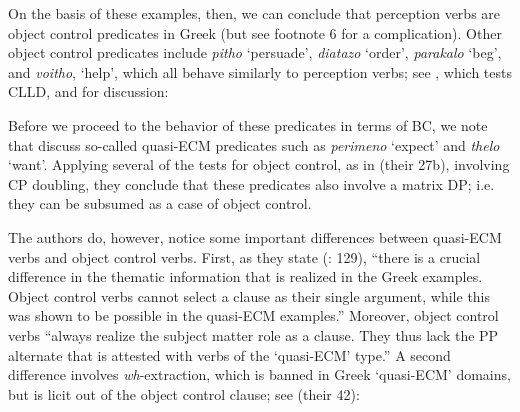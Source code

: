 \documentclass[output=paper]{langsci/langscibook}
\begin{document}
On the basis of these examples, then, we can conclude that perception verbs are object control predicates in Greek (but see footnote 6 for a complication). Other object control predicates include \textit{pitho} ‘persuade’, \textit{diatazo} ‘order’, \textit{parakalo} ‘beg’, and \textit{voitho}, ‘help’, which all behave similarly to perception verbs; see , which tests CLLD, and \citet{Kotzoglou2002} for discussion:

    \z

Before we proceed to the behavior of these predicates in terms of BC, we note that \citet{Kotzoglou2007} discuss so-called quasi-ECM predicates such as \textit{perimeno} ‘expect’ and \textit{thelo} ‘want’. Applying several of the tests for object control, as in  (their 27b), involving CP doubling, they conclude that these predicates also involve a matrix DP; i.e. they can be subsumed as a case of object control. 

    \z

The authors do, however, notice some important differences between quasi-ECM verbs and object control verbs. First, as they state (\citealt{Kotzoglou2007}: 129), “there is a crucial difference in the thematic information that is realized in the Greek examples. Object control verbs cannot select a clause as their single argument, while this was shown to be possible in the quasi-ECM examples.” Moreover, object control verbs “always realize the subject matter role as a clause. They thus lack the PP alternate that is attested with verbs of the ‘quasi-ECM’ type.” A second difference involves \textit{wh}-extraction, which is banned in Greek ‘quasi-ECM’ domains, but is licit out of the object control clause; see  (their 42):
\end{document}
